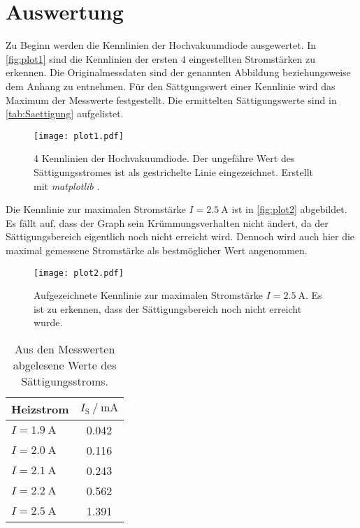 \section{Auswertung}
\label{sec:Auswertung}
Zu Beginn werden die Kennlinien der Hochvakuumdiode ausgewertet. In \autoref{fig:plot1} sind die Kennlinien der ersten $4$ eingestellten Stromstärken zu erkennen. 
Die Originalmessdaten sind der genannten Abbildung beziehungsweise dem Anhang zu entnehmen. Für den Sättgungswert einer Kennlinie wird das Maximum der Messwerte
festgestellt. Die ermittelten Sättigungswerte sind in \autoref{tab:Saettigung} aufgelistet.

\begin{figure}
  \centering
  \texttt{[image: plot1.pdf]}
  \caption{4 Kennlinien der Hochvakuumdiode. Der ungefähre Wert des Sättigungsstromes ist als gestrichelte Linie eingezeichnet.
           Erstellt mit \textit{matplotlib} \cite{matplotlib}.}
  \label{fig:plot1}
\end{figure}

Die Kennlinie zur maximalen Stromstärke $I = \qty{2.5}{\ampere}$ ist in \autoref{fig:plot2} abgebildet. Es fällt auf, dass der Graph sein Krümmungsverhalten nicht ändert, 
da der Sättigungsbereich eigentlich noch nicht erreicht wird. Dennoch wird auch hier die maximal gemessene Stromstärke als bestmöglicher Wert angenommen.

\begin{figure}[H]
  \centering
  \texttt{[image: plot2.pdf]}
  \caption{Aufgezeichnete Kennlinie zur maximalen Stromstärke $I = \qty{2.5}{\ampere}$. Es ist zu erkennen, dass der Sättigungsbereich noch nicht erreicht wurde.}
  \label{fig:plot2}
\end{figure}

\begin{table}[H]
  \centering
  \caption{Aus den Messwerten abgelesene Werte des Sättigungsstroms.}
  \label{tab:Saettigung}
  \begin{tabular}{l S[table-format = 1.3]}
    \toprule
      {Heizstrom} & {$I_\text{S} \mathbin{/} \unit{\milli\ampere}$} \\
      \midrule
      {$ I = \qty{1.9}{\ampere}$} & 0.042 \\
      {$ I = \qty{2.0}{\ampere}$} & 0.116 \\
      {$ I = \qty{2.1}{\ampere}$} & 0.243 \\
      {$ I = \qty{2.2}{\ampere}$} & 0.562 \\
      {$ I = \qty{2.5}{\ampere}$} & 1.391 \\
    \bottomrule
  \end{tabular}
\end{table}

